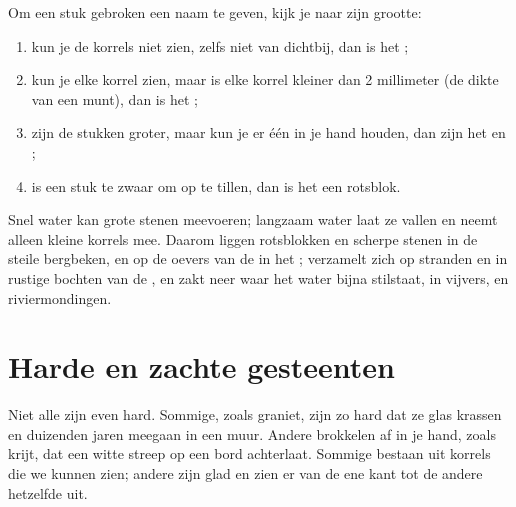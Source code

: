 \begin{method}\label{met:g3:stones-pebbles-sand:sort}
Om een stuk gebroken  een naam te geven, kijk je naar zijn grootte:
\begin{enumerate}
  \item kun je de korrels niet zien, zelfs niet van dichtbij, dan is het
        ;
  \item kun je elke korrel zien, maar is elke korrel kleiner dan
        2 millimeter (de dikte van een munt), dan is het ;
  \item zijn de stukken groter, maar kun je er één in je hand houden, dan
        zijn het  en ;
  \item is een stuk te zwaar om op te tillen, dan is het een rotsblok.
\end{enumerate}
\end{method}

\begin{example}\label{ex:g3:stones-pebbles-sand:where}
Snel water kan grote stenen meevoeren; langzaam water laat ze vallen en
neemt alleen kleine korrels mee. Daarom liggen rotsblokken en scherpe
stenen in de steile bergbeken,  en  op de oevers van de 
in het ;  verzamelt zich op stranden en in rustige bochten van de
, en  zakt neer waar het water bijna stilstaat, in vijvers, 
en riviermondingen.
\end{example}

\section{Harde en zachte gesteenten}

Niet alle  zijn even hard. Sommige, zoals graniet, zijn zo hard
dat ze glas krassen en duizenden jaren meegaan in een muur. Andere
brokkelen af in je hand, zoals krijt, dat een witte streep op een bord
achterlaat. Sommige  bestaan uit korrels die we kunnen zien;
andere zijn glad en zien er van de ene kant tot de andere hetzelfde uit.

